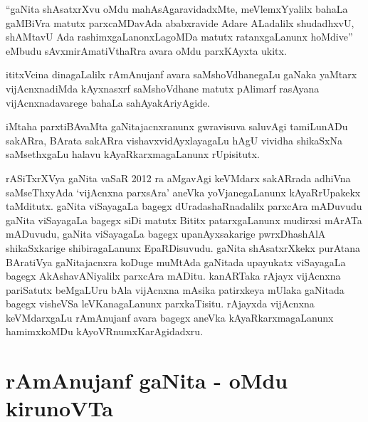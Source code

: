 ``gaNita shAsatxrXvu oMdu mahAsAgaravidadxMte, meVlemxYyalilx bahaLa gaMBiVra matutx parxcaMDavAda ababxravide Adare ALadalilx  shudadhxvU, shAMtavU Ada rashimxgaLanonxLagoMDa matutx ratanxgaLanunx hoMdive'' eMbudu sAvxmirAmatiVthaRra avara oMdu parxKAyxta ukitx.

ititxVcina dinagaLalilx rAmAnujanf avara saMshoVdhanegaLu gaNaka yaMtarx vijAcnxna\-diMda kAyxnasxrf saMshoVdhane matutx pAlimarf rasAyana vijAcnxnadavarege bahaLa sahAya\-kAriyAgide.

iMtaha parxtiBAvaMta gaNitajacnxranunx gwravisuva saluvAgi tamiLunADu sakARra, BArata sakARra vishavxvidAyxlayagaLu hAgU vividha shikaSxNa saMsethxgaLu halavu kAyaRkarxma\-gaLanunx rUpisitutx.

rASiTxrXVya gaNita vaSaR {\rm 2012} ra aMgavAgi keVMdarx sakARrada adhiVna saMseThxyAda `vijAcnxna parxsAra' aneVka yoVjanegaLanunx kAyaRrUpakekx taMditutx. gaNita viSayagaLa bagegx dUradashaRnadalilx parxcAra mADuvudu gaNita viSayagaLa bagegx siDi matutx Bititx patarxgaLanunx mudirxsi mArATa mADuvudu, gaNita viSayagaLa bagegx upanAyxsakarige pwrxDhashAlA shikaSxkarige shibiragaLanunx EpaRDisuvudu. gaNita shAsatxrXkekx purAtana BAratiVya gaNitajacnxra koDuge muMtAda gaNitada upayukatx viSayagaLa bagegx AkAshavANiyalilx parxcAra mADitu. kanARTaka rAjayx vijAcnxna pariSatutx beMgaLUru bAla vijAcnxna mAsika patirxkeya mUlaka gaNitada bagegx visheVSa leVKanagaLanunx parxkaTisitu. rAjayxda vijAcnxna keVMdarxgaLu rAmAnujanf avara bagegx aneVka kAyaRkarxmagaLanunx hamimxkoMDu kAyoVRnumxKarAgidadxru.

\section*{rAmAnujanf gaNita - oMdu kirunoVTa}

